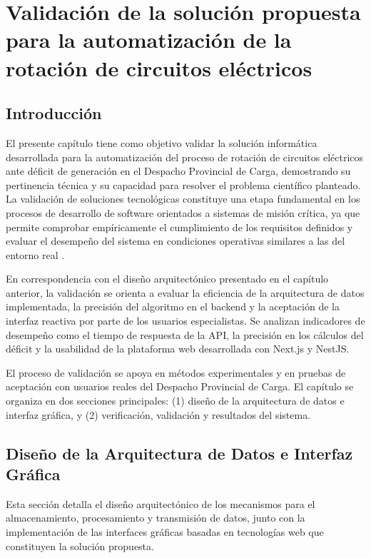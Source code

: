 \chapter{Validación de la solución propuesta para la automatización de la rotación de circuitos eléctricos}

\section{Introducción}

El presente capítulo tiene como objetivo validar la solución informática desarrollada para la automatización del proceso de rotación de circuitos eléctricos ante déficit de generación en el Despacho Provincial de Carga, demostrando su pertinencia técnica y su capacidad para resolver el problema científico planteado. La validación de soluciones tecnológicas constituye una etapa fundamental en los procesos de desarrollo de software orientados a sistemas de misión crítica, ya que permite comprobar empíricamente el cumplimiento de los requisitos definidos y evaluar el desempeño del sistema en condiciones operativas similares a las del entorno real \cite{pressman2020}.

En correspondencia con el diseño arquitectónico presentado en el capítulo anterior, la validación se orienta a evaluar la eficiencia de la arquitectura de datos implementada, la precisión del algoritmo en el backend y la aceptación de la interfaz reactiva por parte de los usuarios especialistas. Se analizan indicadores de desempeño como el tiempo de respuesta de la API, la precisión en los cálculos del déficit y la usabilidad de la plataforma web desarrollada con Next.js y NestJS.

El proceso de validación se apoya en métodos experimentales y en pruebas de aceptación con usuarios reales del Despacho Provincial de Carga. El capítulo se organiza en dos secciones principales: (1) diseño de la arquitectura de datos e interfaz gráfica, y (2) verificación, validación y resultados del sistema.

\section{Diseño de la Arquitectura de Datos e Interfaz Gráfica}

Esta sección detalla el diseño arquitectónico de los mecanismos para el almacenamiento, procesamiento y transmisión de datos, junto con la implementación de las interfaces gráficas basadas en tecnologías web que constituyen la solución propuesta.

